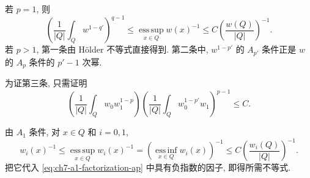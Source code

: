 \begin{Proof}
若 $p=1$, 则
\[
 \left(\frac1{|Q|}\int_Qw^{1-q'}\right)^{q-1}
 \le\operatorname*{ess\,sup}_{x\in Q}w(x)^{-1}
 \le C\left(\frac{w(Q)}{|Q|}\right)^{-1}.
\]
若 $p>1$, 第一条由 Hölder 不等式直接得到. 第二条中, $w^{1-p'}$ 的 $A_{p'}$ 条件正是 $w$ 的 $A_p$ 条件的 $p'-1$ 次幂.

为证第三条, 只需证明
\begin{equation}
\label{eq:ch7-a1-factorization-ap}
 \left(\frac1{|Q|}\int_Qw_0w_1^{1-p}\right)
 \left(\frac1{|Q|}\int_Qw_0^{1-p'}w_1\right)^{p-1}\le C.
\end{equation}

\hypertarget{chapter-07-page-149}{}
由 $A_1$ 条件, 对 $x\in Q$ 和 $i=0,1$,
\[
 w_i(x)^{-1}
 \le\operatorname*{ess\,sup}_{x\in Q}w_i(x)^{-1}
 =\left(\operatorname*{ess\,inf}_{x\in Q}w_i(x)\right)^{-1}
 \le C\left(\frac{w_i(Q)}{|Q|}\right)^{-1}.
\]
把它代入 \eqref{eq:ch7-a1-factorization-ap} 中具有负指数的因子, 即得所需不等式.
\end{Proof}
